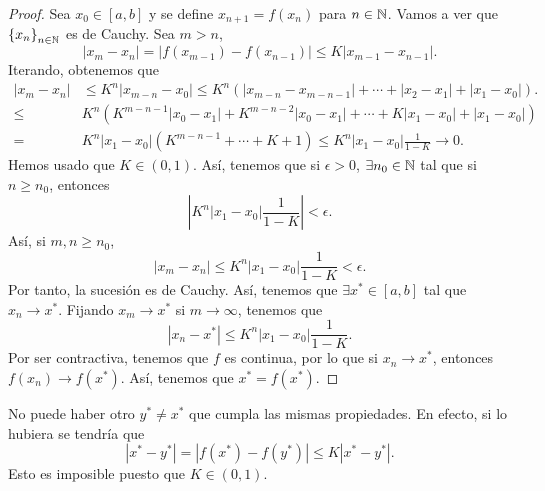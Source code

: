 \begin{proof}
	Sea $\displaystyle x_{0} \in \left[a,b\right]  $ y se define $\displaystyle x_{n+1} = f\left(x_{n}\right) $ para $\displaystyle n \in \mathbb{N} $. Vamos a ver que $\displaystyle \left\{ x_{n}\right\} _{n\in\mathbb{N}} $ es de Cauchy. Sea $\displaystyle m > n $, 
	\[ \left|x_{m}-x_{n}\right| = \left|f\left(x_{m - 1} \right)- f\left(x_{n-1}\right)\right| \leq K \left|x_{m - 1} - x_{n-1}\right| .\]
	Iterando, obtenemos que 
\[
\begin{split}
	\left|x_{m}-x_{n}\right| & \leq K^{n} \left|x_{m - n}-x_{0}\right| \leq K^{n} \left( \left|x_{m - n}-x_{m - n - 1}\right| + \cdots + \left|x_{2}-x_{1}\right| + \left|x_{1}-x_{0}\right|\right) .\\
	\leq & K^{n} \left(K^{m - n - 1} \left|x_{0}-x_{1}\right| + K^{m - n - 2} \left|x_{0}-x_{1}\right| + \cdots + K \left|x_{1}-x_{0}\right| + \left|x_{1}-x_{0}\right|\right) \\
	= & K^{n} \left|x_{1}-x_{0}\right| \left(K^{m - n - 1} + \cdots + K + 1\right) \leq K^{n} \left|x_{1}-x_{0}\right| \frac{1}{1- K} \to 0.
\end{split}
\]
Hemos usado que $\displaystyle K \in \left(0,1\right) $. Así, tenemos que si $\displaystyle \epsilon > 0 $, $\displaystyle \exists n_{0} \in \mathbb{N} $ tal que si $\displaystyle n \geq n_{0} $, entonces
\[ \left|K^{n} \left|x_{1}-x_{0}\right|\frac{1}{1-K}\right| < \epsilon .\]
Así, si $\displaystyle m,n \geq n_{0} $, 
\[ \left|x_{m}-x_{n}\right| \leq K^{n} \left|x_{1}-x_{0}\right|\frac{1}{1-K} < \epsilon  .\]
Por tanto, la sucesión es de Cauchy. Así, tenemos que $\displaystyle \exists x^{*} \in \left[a,b\right]  $ tal que $\displaystyle x_{n} \to x^{*} $. Fijando $\displaystyle x_{m} \to x^{*} $ si $\displaystyle m \to \infty $, tenemos que
\[ \left|x_{n}-x^{*}\right| \leq K^{n} \left|x_{1}-x_{0}\right|\frac{1}{1-K} .\]
Por ser contractiva, tenemos que $\displaystyle f $ es continua, por lo que si $\displaystyle x_{n} \to x^{*} $, entonces $\displaystyle f\left(x_{n}\right) \to f\left(x^{*}\right) $. Así, tenemos que $\displaystyle x^{*} = f\left(x^{*}\right) $.
\end{proof}
\begin{observation}
\normalfont No puede haber otro $\displaystyle y^{*} \neq x^{*}$ que cumpla las mismas propiedades. En efecto, si lo hubiera se tendría que
\[ \left|x^{*}-y^{*}\right| = \left|f\left(x^{*}\right)-f\left(y^{*}\right)\right| \leq K \left|x^{*}-y^{*}\right| .\]
Esto es imposible puesto que $\displaystyle K \in\left(0,1\right) $.
\end{observation}
